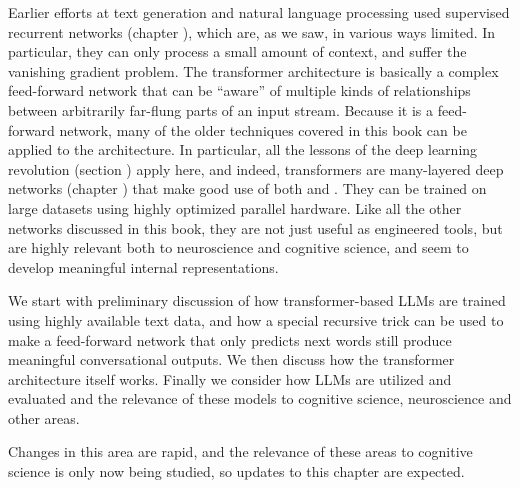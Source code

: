 
Earlier efforts at text generation and natural language processing used supervised recurrent networks (chapter ), which are, as we saw, in various ways limited. In particular, they can only process a small amount of context, and suffer the vanishing gradient problem. The transformer architecture is basically a complex feed-forward network that can be ``aware'' of multiple kinds of relationships between arbitrarily far-flung parts of an input stream. Because it is a feed-forward network, many of the older techniques covered in this book can be applied to the architecture. In particular, all the lessons of the deep learning revolution (section ) apply here, and indeed, transformers are many-layered deep networks (chapter ) that make good use of both  and . They can be trained on large datasets using highly optimized parallel hardware. Like all the other networks discussed in this book, they are not just useful as engineered tools, but are highly relevant both to neuroscience and cognitive science, and seem to develop meaningful internal representations. 

We start with preliminary discussion of how transformer-based LLMs are trained using highly available text data, and how a special recursive trick can be used to make a feed-forward network that only predicts next words still produce meaningful conversational outputs. We then discuss how the transformer architecture itself works. Finally we consider how LLMs are utilized and evaluated and the relevance of these models to cognitive science, neuroscience and other areas.

Changes in this area are rapid, and the relevance of these areas to cognitive science is only now being studied, so updates to this chapter are expected.


